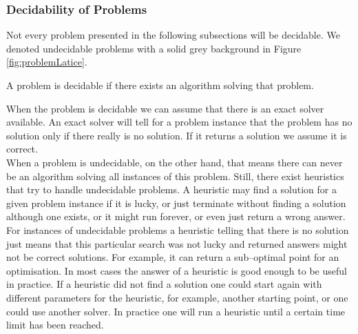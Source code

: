 \subsubsection{Decidability of Problems}
Not every problem presented in the following subsections will be decidable. We denoted undecidable problems with a solid grey background in Figure \ref{fig:problemLatice}. 
\begin{definition}[decidability]
A problem is decidable if there exists an algorithm solving that problem. 
\end{definition}
When the problem is decidable we can assume that there is an exact solver available. An exact solver will tell for a problem instance that the problem has no solution only if there really is no solution. If it returns a solution we assume it is correct.\\
When a problem is undecidable, on the other hand, that means there can never be an algorithm solving all instances of this problem. 
Still, there exist heuristics that try to handle undecidable problems. A heuristic may find a solution for a given problem instance if it is lucky, or just terminate without finding a solution although one exists, or it might run forever, or even just return a wrong answer. For instances of undecidable problems a heuristic telling that there is no solution just means that this particular search was not lucky and returned answers might not be correct solutions. For example, it can return a sub--optimal point for an optimisation. In most cases the answer of a heuristic is good enough to be useful in practice. 
If a heuristic did not find a solution one could start again with different parameters for the heuristic, for example, another starting point, or one could use another solver. In practice one will run a heuristic until a certain time limit has been reached.
